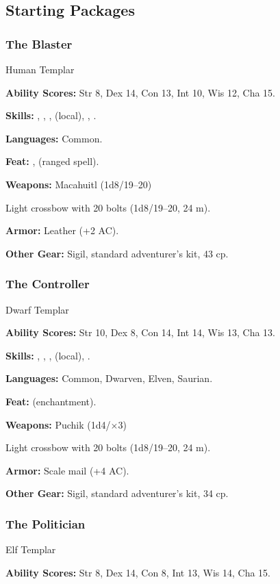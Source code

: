 \subsection{Starting Packages}
\subsubsection{The Blaster}
Human Templar

\textbf{Ability Scores:} Str 8, Dex 14, Con 13, Int 10, Wis 12, Cha 15.

\textbf{Skills:} , , ,  (local), , .

\textbf{Languages:} Common.

\textbf{Feat:} ,  (ranged spell).

\textbf{Weapons:} Macahuitl (1d8/19--20)

Light crossbow with 20 bolts (1d8/19--20, 24 m).

\textbf{Armor:} Leather (+2 AC).

\textbf{Other Gear:} Sigil, standard adventurer's kit, 43 cp.

\subsubsection{The Controller}
Dwarf Templar

\textbf{Ability Scores:} Str 10, Dex 8, Con 14, Int 14, Wis 13, Cha 13.

\textbf{Skills:} , , ,  (local), .

\textbf{Languages:} Common, Dwarven, Elven, Saurian.

\textbf{Feat:}  (enchantment).

\textbf{Weapons:} Puchik (1d4/$\times$3)

Light crossbow with 20 bolts (1d8/19--20, 24 m).

\textbf{Armor:} Scale mail (+4 AC).

\textbf{Other Gear:} Sigil, standard adventurer's kit, 34 cp.

\subsubsection{The Politician}
Elf Templar

\textbf{Ability Scores:} Str 8, Dex 14, Con 8, Int 13, Wis 14, Cha 15.

